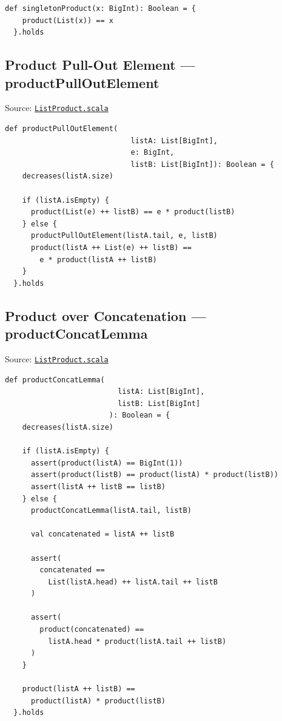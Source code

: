 \begin{lstlisting}[style=scala]
  def singletonProduct(x: BigInt): Boolean = {
    product(List(x)) == x
  }.holds
\end{lstlisting}

\subsection{Product Pull-Out Element --- productPullOutElement}

Source:
\href{https://github.com/thiagomata/prime-numbers/blob/list-article-v1.0.0/src/main/scala/v1/chapter3/list/properties/ListProduct.scala}{\texttt{ListProduct.scala}}

\begin{lstlisting}[style=scala]
  def productPullOutElement(
                             listA: List[BigInt],
                             e: BigInt,
                             listB: List[BigInt]): Boolean = {
    decreases(listA.size)

    if (listA.isEmpty) {
      product(List(e) ++ listB) == e * product(listB)
    } else {
      productPullOutElement(listA.tail, e, listB)
      product(listA ++ List(e) ++ listB) ==
        e * product(listA ++ listB)
    }
  }.holds
\end{lstlisting}

\subsection{Product over Concatenation --- productConcatLemma}

Source:
\href{https://github.com/thiagomata/prime-numbers/blob/list-article-v1.0.0/src/main/scala/v1/chapter3/list/properties/ListProduct.scala}{\texttt{ListProduct.scala}}

\begin{lstlisting}[style=scala]
  def productConcatLemma(
                          listA: List[BigInt],
                          listB: List[BigInt]
                        ): Boolean = {
    decreases(listA.size)

    if (listA.isEmpty) {
      assert(product(listA) == BigInt(1))
      assert(product(listB) == product(listA) * product(listB))
      assert(listA ++ listB == listB)
    } else {
      productConcatLemma(listA.tail, listB)

      val concatenated = listA ++ listB

      assert(
        concatenated ==
          List(listA.head) ++ listA.tail ++ listB
      )

      assert(
        product(concatenated) ==
          listA.head * product(listA.tail ++ listB)
      )
    }

    product(listA ++ listB) ==
      product(listA) * product(listB)
  }.holds
\end{lstlisting}

